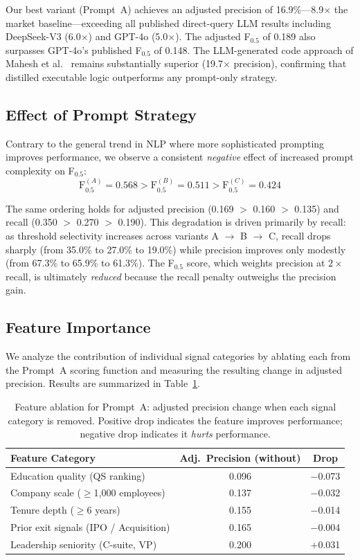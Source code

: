 \documentclass{article}
\begin{document}
Our best variant (Prompt~A) achieves an adjusted precision of 16.9\%---8.9$\times$ the market baseline---exceeding all published direct-query LLM results including DeepSeek-V3 (6.0$\times$) and GPT-4o (5.0$\times$). The adjusted F$_{0.5}$ of 0.189 also surpasses GPT-4o's published F$_{0.5}$ of 0.148. The LLM-generated code approach of Mahesh et al.~\cite{mahesh2026stochastic} remains substantially superior (19.7$\times$ precision), confirming that distilled executable logic outperforms any prompt-only strategy.

\subsection{Effect of Prompt Strategy}

Contrary to the general trend in NLP where more sophisticated prompting improves performance, we observe a consistent \emph{negative} effect of increased prompt complexity on F$_{0.5}$:
\[
\text{F}_{0.5}^{(A)} = 0.568 > \text{F}_{0.5}^{(B)} = 0.511 > \text{F}_{0.5}^{(C)} = 0.424
\]

The same ordering holds for adjusted precision (0.169 $>$ 0.160 $>$ 0.135) and recall (0.350 $>$ 0.270 $>$ 0.190). This degradation is driven primarily by recall: as threshold selectivity increases across variants A $\to$ B $\to$ C, recall drops sharply (from 35.0\% to 27.0\% to 19.0\%) while precision improves only modestly (from 67.3\% to 65.9\% to 61.3\%). The F$_{0.5}$ score, which weights precision at $2\times$ recall, is ultimately \emph{reduced} because the recall penalty outweighs the precision gain.

\subsection{Feature Importance}

We analyze the contribution of individual signal categories by ablating each from the Prompt~A scoring function and measuring the resulting change in adjusted precision. Results are summarized in Table~\ref{tab:ablation}.

\begin{table}[h]
\centering
\caption{Feature ablation for Prompt~A: adjusted precision change when each signal category is removed. Positive drop indicates the feature improves performance; negative drop indicates it \emph{hurts} performance.}
\label{tab:ablation}
\begin{tabular}{lcc}
\toprule
\textbf{Feature Category} & \textbf{Adj.\ Precision (without)} & \textbf{Drop} \\
\midrule
Education quality (QS ranking)         & 0.096 & $-$0.073 \\
Company scale ($\geq$1,000 employees)  & 0.137 & $-$0.032 \\
Tenure depth ($\geq$6 years)           & 0.155 & $-$0.014 \\
Prior exit signals (IPO / Acquisition) & 0.165 & $-$0.004 \\
Leadership seniority (C-suite, VP)     & 0.200 & $+$0.031 \\
\bottomrule
\end{tabular}
\end{table}
\end{document}

